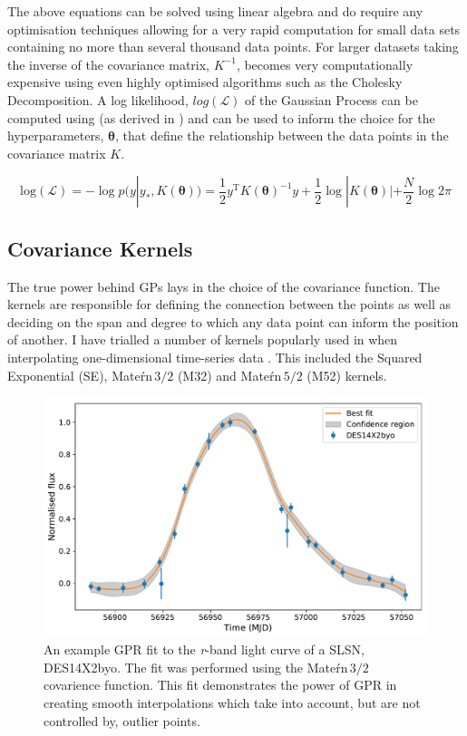 The above equations can be solved using linear algebra and do require any optimisation techniques allowing for a very rapid computation for small data sets containing no more than several thousand data points. For larger datasets taking the inverse of the covariance matrix, $K^{-1}$, becomes very computationally expensive using even highly optimised algorithms such as the Cholesky Decomposition. A log likelihood, $log(\mathcal{L})$ of the Gaussian Process can be computed using  (as derived in \citet{Rasmussen2006}) and can be used to inform the choice for the hyperparameters, $\mathbf{\theta}$, that define the relationship between the data points in the covariance matrix $K$.

\begin{equation} \label{eg:logGP}
\mathrm{log(\mathcal{L})} = - \log p(y|y_*, K(\mathbf{\theta})) = \frac{1}{2} y^{\mathrm{T}} K(\mathbf{\theta})^{-1} y + \frac{1}{2} \log |K(\mathbf{\theta})| + \frac{N}{2} \log 2 \pi
\end{equation}

\subsection{Covariance Kernels} \label{sec:GPkernels}
The true power behind GPs lays in the choice of the covariance function. The kernels are responsible for defining the connection between the points as well as deciding on the span and degree to which any data point can inform the position of another. I have trialled a number of kernels popularly used in when interpolating one-dimensional time-series data \citep{Rasmussen2006}. This included the Squared Exponential (SE), Mate\'rn\,$3/2$ (M32) and Mate\'rn\,$5/2$ (M52) kernels.

\begin{figure}
  \centering
  \includegraphics[width=\textwidth]{Figures/Chapter4/GP_Example}
  \caption{An example GPR fit to the \textit{r}-band light curve of a SLSN, DES14X2byo. The fit was performed using the Mate\'rn\,$3/2$ covarience function. This fit demonstrates the power of GPR in creating smooth interpolations which take into account, but are not controlled by, outlier points.}
  \label{fig:GPKernels}
\end{figure}

